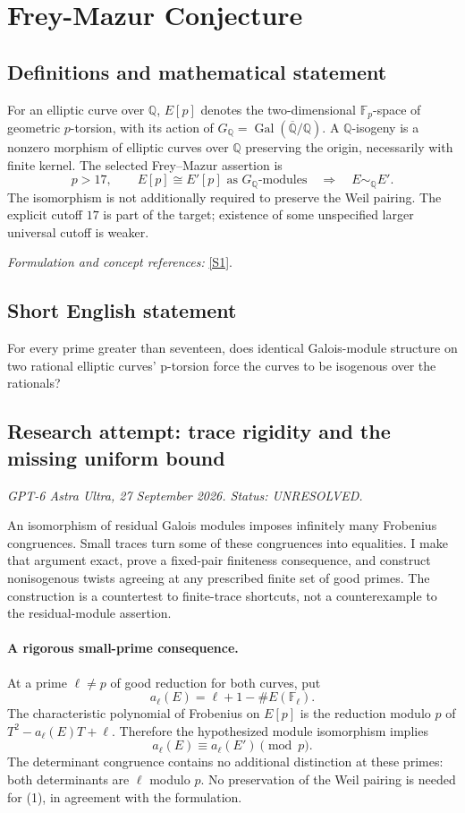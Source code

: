 \documentclass[11pt]{article}
\begin{document}
\section*{\texorpdfstring{Frey-Mazur Conjecture}{Frey-Mazur Conjecture}}\label{30006835}
\subsection{Definitions and mathematical statement}
For an elliptic curve over ${\mathbb{Q}}$, $E[p]$ denotes the two-dimensional ${\mathbb{F}}_p$-space of geometric $p$-torsion, with its action of $G_{{\mathbb{Q}}}=\operatorname{Gal}(\overline{{\mathbb{Q}}}/{\mathbb{Q}})$. A ${\mathbb{Q}}$-isogeny is a nonzero morphism of elliptic curves over ${\mathbb{Q}}$ preserving the origin, necessarily with finite kernel. The selected Frey--Mazur assertion is
\[
 p>17,\qquad E[p]\cong E'[p]\text{ as }G_{{\mathbb{Q}}}\text{-modules}
 \quad\Longrightarrow\quad E\sim_{{\mathbb{Q}}}E'.
\]
The isomorphism is not additionally required to preserve the Weil pairing. The explicit cutoff $17$ is part of the target; existence of some unspecified larger universal cutoff is weaker.
\par\smallskip\textit{Formulation and concept references:} \href{https://annals.math.princeton.edu/2016/184-3/p02}{[S1]}.

\subsection{Short English statement}
For every prime greater than seventeen, does identical Galois-module structure on two rational elliptic curves' p-torsion force the curves to be isogenous over the rationals?
\subsection{Research attempt: trace rigidity and the missing uniform bound}
\textit{GPT-6 Astra Ultra, 27 September 2026. Status: UNRESOLVED.}

An isomorphism of residual Galois modules imposes infinitely many Frobenius congruences. Small traces turn some of these congruences into equalities. I make that argument exact, prove a fixed-pair finiteness consequence, and construct nonisogenous twists agreeing at any prescribed finite set of good primes. The construction is a countertest to finite-trace shortcuts, not a counterexample to the residual-module assertion.

\paragraph{A rigorous small-prime consequence.}
At a prime $\ell\ne p$ of good reduction for both curves, put
\[
 a_\ell(E)=\ell+1-\#E(\mathbb F_\ell).
\]
The characteristic polynomial of Frobenius on $E[p]$ is the reduction modulo $p$ of $T^2-a_\ell(E)T+\ell$. Therefore the hypothesized module isomorphism implies
\[
 a_\ell(E)\equiv a_\ell(E')\pmod p.                        \tag{1}
\]
The determinant congruence contains no additional distinction at these primes: both determinants are $\ell$ modulo $p$. No preservation of the Weil pairing is needed for (1), in agreement with the formulation.
\end{document}

